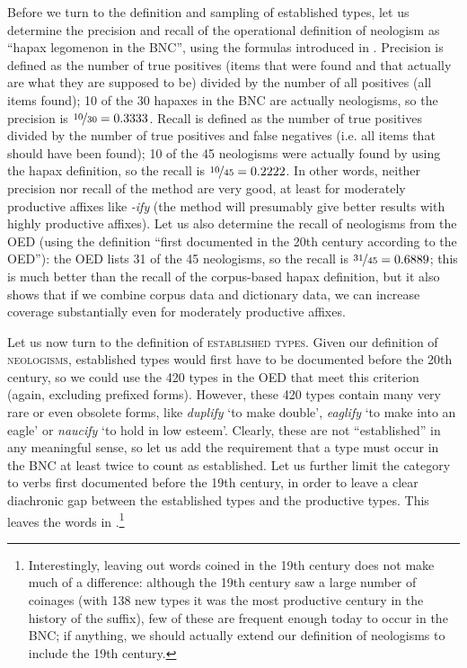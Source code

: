 Before we turn to the definition and sampling of established types,  let us determine the precision  and recall  of the operational  definition of neologism  as ``hapax  legomenon in the BNC'',  using the formulas introduced in . Precision is defined as the number of true positives (items that were found and that actually are what they are supposed to be) divided by the number of all positives (all items found); 10 of the 30 hapaxes in the BNC  are actually neologisms, so the precision is $\nicefrac{10}{30} = 0.3333$. Recall is defined as the number of true positives divided by the number of true positives and false negatives (i.e. all items that should have been found); 10 of the 45 neologisms  were actually found by using the hapax definition, so the recall is $\nicefrac{10}{45} = 0.2222$. In other words, neither precision  nor recall of the method are very good, at least for moderately productive  affixes  like \textit{-ify} (the method will presumably give better results with highly productive affixes).  Let us also determine the recall of neologisms from the OED  (using the definition ``first documented in the 20th century according to the OED''): the OED  lists 31 of the 45 neologisms,  so the recall is $\nicefrac{31}{45} = 0.6889$; this is much better than the recall  of the corpus\hyp{}based hapax  definition, but it also shows that if we combine corpus data and dictionary  data, we can increase coverage substantially even for moderately productive affixes.

Let us now turn to the definition of \textsc{established types}.  Given our definition of \textsc{neologisms},  established types would first have to be documented before the 20th century, so we could use the 420 types in the OED  that meet this criterion (again, excluding prefixed  forms). However, these 420 types contain many very rare or even obsolete forms, like \textit{duplify} `to make double', \textit{eaglify} `to make into an eagle' or \textit{naucify} `to hold in low esteem'. Clearly, these are not ``established'' in any meaningful sense, so let us add the requirement that a type must occur in the BNC  at least twice to count as established. Let us further limit the category to verbs  first documented before the 19th century, in order to leave a clear diachronic  gap between the established types  and the productive  types. This leaves the words in .\footnote{Interestingly, leaving out words coined in the 19th century does not make much of a difference: although the 19th century saw a large number of coinages (with 138 new types  it was the most productive  century in the history of the suffix),  few of these are frequent enough today to occur in the BNC;  if anything, we should actually extend our definition of neologisms  to include the 19th century.}

